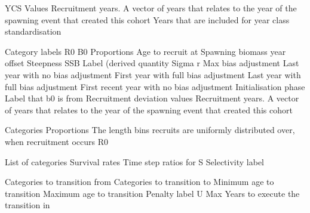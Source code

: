  {YCS Values}
 {Recruitment years. A vector of years that relates to the year of the spawning event that created this cohort}
 {Years that are included for year class standardisation}
\par\textbf{}\par
{} {Category labels}
 {R0}
 {B0}
 {Proportions}
 {Age to recruit at}
 {Spawning biomass year offset}
 {Steepness}
 {SSB Label (derived quantity}
 {Sigma r}
 {Max bias adjustment}
 {Last year with no bias adjustment}
 {First year with full bias adjustment}
 {Last year with full bias adjustment}
 {First recent year with no bias adjustment}
 {Initialisation phase Label that b0 is from}
 {Recruitment deviation values}
 {Recruitment years. A vector of years that relates to the year of the spawning event that created this cohort}
\par\textbf{}\par
{} {Categories}
 {Proportions}
 {The length bins recruits are uniformly distributed over, when recruitment occurs}
 {R0}
\par\textbf{}\par
{} {List of categories}
 {Survival rates}
 {Time step ratios for S}
 {Selectivity label}
\par\textbf{}\par
{} {Categories to transition from}
 {Categories to transition to}
 {Minimum age to transition}
 {Maximum age to transition}
 {Penalty label}
 {U Max}
 {Years to execute the transition in}
 {}
 {}
 {}
 {}
 {}
 {}
